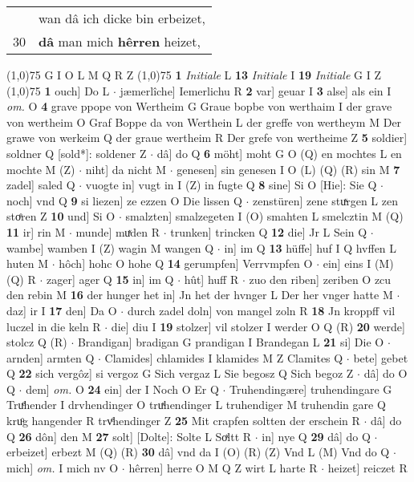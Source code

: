 \documentclass[8pt,a4paper,notitlepage]{article}
\begin{document}
\begin{table}[ht]
\begin{minipage}[t]{0.5\linewidth}
\begin{tabular}{rl}
 & wan dâ ich dicke bin erbeizet,\\ 
30 & \textbf{dâ} man mich \textbf{hêrren} heizet,\\ 
\end{tabular}
\scriptsize
\line(1,0){75} \newline
G I O L M Q R Z \newline
\line(1,0){75} \newline
\textbf{1} \textit{Initiale} L  \textbf{13} \textit{Initiale} I  \textbf{19} \textit{Initiale} G I Z  \newline
\line(1,0){75} \newline
\textbf{1} ouch] Do L  $\cdot$ jæmerlîche] Iemerlichu R \textbf{2} var] geuar I \textbf{3} alse] als ein I \textit{om.} O \textbf{4} grave ppope von Wertheim G Graue bopbe von werthaim I der grave von wertheim O Graf Boppe da von Werthein L der greffe von wertheym M Der grawe von werkeim Q der graue wertheim R Der grefe von wertheime Z \textbf{5} soldier] soldner Q [sold*]: soldener Z  $\cdot$ dâ] do Q \textbf{6} möht] moht G O (Q) en mochtes L en mochte M (Z)  $\cdot$ niht] da nicht M  $\cdot$ genesen] sin genesen I O (L) (Q) (R) sin M \textbf{7} zadel] saled Q  $\cdot$ vuogte in] vugt in I (Z) in fugte Q \textbf{8} sine] Si O [Hie]: Sie Q  $\cdot$ noch] vnd Q \textbf{9} si liezen] ze ezzen O Die lissen Q  $\cdot$ zenstüren] zene stuͯrgen L zen stoͤren Z \textbf{10} und] Si O  $\cdot$ smalzten] smalzegeten I (O) smahten L smelcztin M (Q) \textbf{11} ir] rin M  $\cdot$ munde] muͯden R  $\cdot$ trunken] trincken Q \textbf{12} die] Jr L Sein Q  $\cdot$ wambe] wamben I (Z) wagin M wangen Q  $\cdot$ in] im Q \textbf{13} hüffe] huf I Q hvffen L huten M  $\cdot$ hôch] hohc O hohe Q \textbf{14} gerumpfen] Verrvmpfen O  $\cdot$ ein] eins I (M) (Q) R  $\cdot$ zager] ager Q \textbf{15} in] im Q  $\cdot$ hût] huff R  $\cdot$ zuo den riben] zeriben O zcu den rebin M \textbf{16} der hunger het in] Jn het der hvnger L Der her vnger hatte M  $\cdot$ daz] ir I \textbf{17} den] Da O  $\cdot$ durch zadel doln] von mangel zoln R \textbf{18} Jn kroppff vil luczel in die keln R  $\cdot$ die] diu I \textbf{19} stolzer] vil stolzer I werder O Q (R) \textbf{20} werde] stolcz Q (R)  $\cdot$ Brandigan] bradigan G prandigan I Brandegan L \textbf{21} si] Die O  $\cdot$ arnden] armten Q  $\cdot$ Clamides] chlamides I klamides M Z Clamites Q  $\cdot$ bete] gebet Q \textbf{22} sich vergôz] si vergoz G Sich vergaz L Sie begosz Q Sich begoz Z  $\cdot$ dâ] do O Q  $\cdot$ dem] \textit{om.} O \textbf{24} ein] der I Noch O Er Q  $\cdot$ Truhendingære] truhendingare G Truͤhender I drvhendinger O truͯhendinger L truhendiger M truhendin gare Q kruͦg hangender R trvͤhendinger Z \textbf{25} Mit crapfen soltten der erschein R  $\cdot$ dâ] do Q \textbf{26} dôn] den M \textbf{27} solt] [Dolte]: Solte L Soͯltt R  $\cdot$ in] nye Q \textbf{29} dâ] do Q  $\cdot$ erbeizet] erbezt M (Q) (R) \textbf{30} dâ] vnd da I (O) (R) (Z) Vnd L (M) Vnd do Q  $\cdot$ mich] \textit{om.} I mich nv O  $\cdot$ hêrren] herre O M Q Z wirt L harte R  $\cdot$ heizet] reiczet R \newline

\end{minipage}
\end{table}
\end{document}
